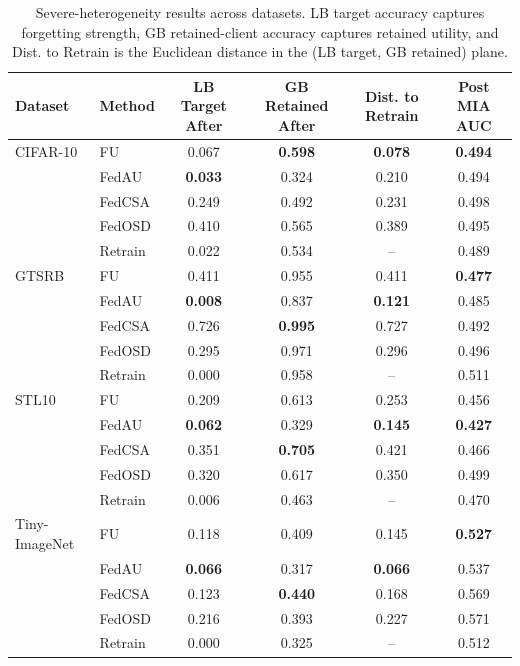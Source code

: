 \begin{table}[t]
\centering
\caption{Severe-heterogeneity results across datasets. LB target accuracy captures forgetting strength, GB retained-client accuracy captures retained utility, and Dist. to Retrain is the Euclidean distance in the (LB target, GB retained) plane.}
\label{tab:lbgb_cross_dataset_results}
\begin{tabular}{llcccc}
\toprule
Dataset & Method & LB Target After & GB Retained After & Dist. to Retrain & Post MIA AUC \\
\midrule
CIFAR-10 & FU & 0.067 & \textbf{0.598} & \textbf{0.078} & \textbf{0.494} \\
 & FedAU & \textbf{0.033} & 0.324 & 0.210 & 0.494 \\
 & FedCSA & 0.249 & 0.492 & 0.231 & 0.498 \\
 & FedOSD & 0.410 & 0.565 & 0.389 & 0.495 \\
 & Retrain & 0.022 & 0.534 & -- & 0.489 \\
\midrule
GTSRB & FU & 0.411 & 0.955 & 0.411 & \textbf{0.477} \\
 & FedAU & \textbf{0.008} & 0.837 & \textbf{0.121} & 0.485 \\
 & FedCSA & 0.726 & \textbf{0.995} & 0.727 & 0.492 \\
 & FedOSD & 0.295 & 0.971 & 0.296 & 0.496 \\
 & Retrain & 0.000 & 0.958 & -- & 0.511 \\
\midrule
STL10 & FU & 0.209 & 0.613 & 0.253 & 0.456 \\
 & FedAU & \textbf{0.062} & 0.329 & \textbf{0.145} & \textbf{0.427} \\
 & FedCSA & 0.351 & \textbf{0.705} & 0.421 & 0.466 \\
 & FedOSD & 0.320 & 0.617 & 0.350 & 0.499 \\
 & Retrain & 0.006 & 0.463 & -- & 0.470 \\
\midrule
Tiny-ImageNet & FU & 0.118 & 0.409 & 0.145 & \textbf{0.527} \\
 & FedAU & \textbf{0.066} & 0.317 & \textbf{0.066} & 0.537 \\
 & FedCSA & 0.123 & \textbf{0.440} & 0.168 & 0.569 \\
 & FedOSD & 0.216 & 0.393 & 0.227 & 0.571 \\
 & Retrain & 0.000 & 0.325 & -- & 0.512 \\
\bottomrule
\end{tabular}
\end{table}